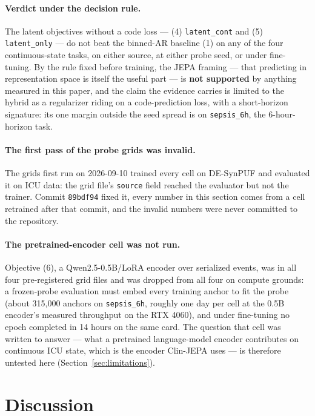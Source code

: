 \documentclass[11pt,a4paper]{article}
\newcommand{\code}[1]{\texttt{\small #1}}
\begin{document}
\paragraph{Verdict under the decision rule.} The latent objectives without a
code loss --- (4) \code{latent\_cont} and (5) \code{latent\_only} --- do not
beat the binned-AR baseline (1) on any of the four continuous-state tasks, on
either source, at either probe seed, or under fine-tuning. By the rule fixed
before training, the JEPA framing --- that predicting in representation space
is itself the useful part --- is \textbf{not supported} by anything measured
in this paper, and the claim the evidence carries is limited to the hybrid as
a regularizer riding on a code-prediction loss, with a short-horizon signature:
its one margin outside the seed spread is on \code{sepsis\_6h}, the
6-hour-horizon task.

\paragraph{The first pass of the probe grids was invalid.} The grids first run
on 2026-09-10 trained every cell on DE-SynPUF and evaluated it on ICU data:
the grid file's \code{source} field reached the evaluator but not the trainer.
Commit \code{89bdf94} fixed it, every number in this section comes from a cell
retrained after that commit, and the invalid numbers were never committed to
the repository.

\paragraph{The pretrained-encoder cell was not run.} Objective (6), a
Qwen2.5-0.5B/LoRA encoder over serialized events, was in all four
pre-registered grid files and was dropped from all four on compute grounds: a
frozen-probe evaluation must embed every training anchor to fit the probe
(about 315{,}000 anchors on \code{sepsis\_6h}, roughly one day per cell at the
0.5B encoder's measured throughput on the RTX 4060), and under fine-tuning no
epoch completed in 14 hours on the same card. The question that cell was
written to answer --- what a pretrained language-model encoder contributes on
continuous ICU state, which is the encoder Clin-JEPA uses --- is therefore
untested here (Section~\ref{sec:limitations}).

\section{Discussion}
\label{sec:discussion}
\end{document}
